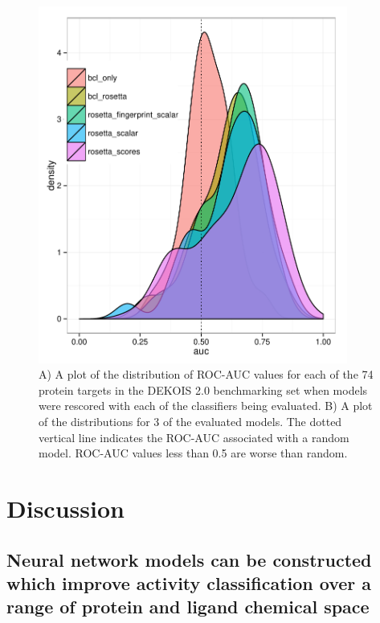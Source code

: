 \begin{figure}
\centering
\includegraphics[width=4in]{figures/hts/dekois_screen_all.pdf}
\caption{
A) A plot of the distribution of ROC-AUC values for each of the 74 protein targets in the DEKOIS 2.0 benchmarking set when models were rescored with each of the classifiers being evaluated.
B) A plot of the distributions for 3 of the evaluated models.
The dotted vertical line indicates the ROC-AUC associated with a random model.
ROC-AUC values less than 0.5 are worse than random. 
}
\label{fig:dekois_roc_all}
\end{figure}

\section{Discussion}

\subsection{Neural network models can be constructed which improve activity classification over a range of protein and ligand chemical space}

